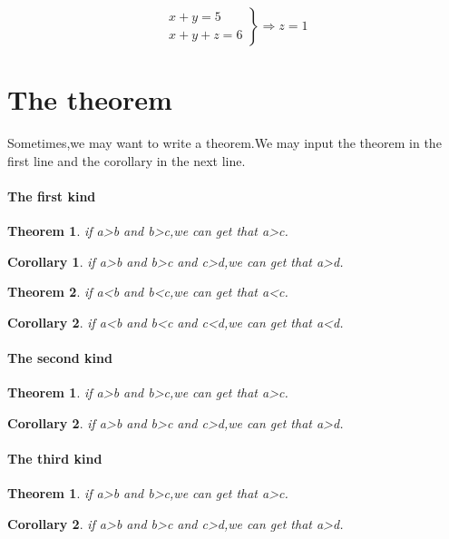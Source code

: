 \documentclass[UTF8]{ctexart}
\begin{document}
\begin{equation}
\left.
\begin{gathered}
x+y=5\\
x+y+z=6
\end{gathered}
\right \}
\Rightarrow z=1
\end{equation}

\part{The theorem}
Sometimes,we may want to write a theorem.We may input the theorem in the first line and the corollary in the next line.
\subsection{The first kind}
\newtheorem{theorem}{Theorem}
\newtheorem{corollary}{Corollary}
\begin{theorem}
if a\textgreater b and b\textgreater c,we can get that a\textgreater c.
\end{theorem}
\begin{corollary}
if a\textgreater b and b\textgreater c and c\textgreater d,we can get that a\textgreater d.
\end{corollary}

\begin{theorem}
if a\textless b and b\textless c,we can get that a\textless c.
\end{theorem}
\begin{corollary}
if a\textless b and b\textless c and c\textless d,we can get that a\textless d.
\end{corollary}

\subsection{The second kind}
\newtheorem{thrm}{Theorem}
\newtheorem{corl}[thrm]{Corollary}
\begin{thrm}
if a\textgreater b and b\textgreater c,we can get that a\textgreater c.
\end{thrm}
\begin{corl}
if a\textgreater b and b\textgreater c and c\textgreater d,we can get that a\textgreater d.
\end{corl}

\subsection{The third kind}
\newtheorem{thm}{Theorem}[section]
\newtheorem{cor}[thm]{Corollary}
\begin{thm}
if a\textgreater b and b\textgreater c,we can get that a\textgreater c.
\end{thm}
\begin{cor}
if a\textgreater b and b\textgreater c and c\textgreater d,we can get that a\textgreater d.
\end{cor}
\end{document}
